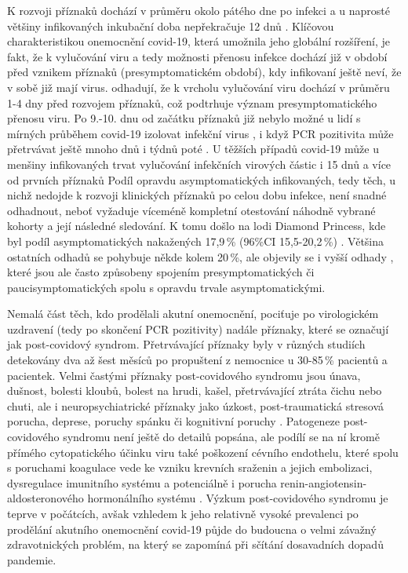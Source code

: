 K rozvoji příznaků dochází v průměru okolo pátého dne po infekci \cite{Zhang:2020,Xie:2020} a u naprosté většiny infikovaných inkubační doba nepřekračuje 12 dnů \cite{Wiersinga:2020}. Klíčovou charakteristikou onemocnění covid-19, která umožnila jeho globální rozšíření, je fakt, že k vylučování viru a tedy možnosti přenosu infekce dochází již v období před vznikem příznaků (presymptomatickém období), kdy infikovaní ještě neví, že v sobě již mají virus. \cite{Jones:2021} odhadují, že k vrcholu vylučování viru dochází v průměru 1-4 dny před rozvojem příznaků, což podtrhuje význam presymptomatického přenosu viru. Po 9.-10. dnu od začátku příznaků již nebylo možné u lidí s mírných průběhem covid-19 izolovat infekční virus \cite{Wolfel:2020,Jones:2021}, 
i když PCR pozitivita může přetrvávat ještě mnoho dnů i týdnů poté \cite{Byrne:2020}. U těžších případů covid-19 může u menšiny infikovaných trvat vylučování infekčních virových částic i 15 dnů a více od prvních příznaků \cite{Kampen:2021} Podíl opravdu asymptomatických infikovaných, tedy těch, u nichž nedojde k rozvoji klinických příznaků po celou dobu infekce, není snadné odhadnout, neboť vyžaduje víceméně kompletní otestování náhodně vybrané kohorty a její následné sledování. K tomu došlo na lodi Diamond Princess, kde byl podíl  asymptomatických nakažených 17,9\,\% (96\%CI 15,5-20,2\,\%) \cite{Mizumoto:2020}. Většina ostatních odhadů se pohybuje někde kolem 20\,\%, ale objevily se i vyšší odhady \cite{Yanes-Lane:2020}, které jsou ale často způsobeny spojením presymptomatických či paucisymptomatických spolu s opravdu trvale asymptomatickými.

Nemalá část těch, kdo prodělali akutní onemocnění, pociťuje po virologickém uzdravení (tedy po skončení PCR pozitivity)  nadále příznaky, které se označují jak post-covidový syndrom. Přetrvávající příznaky byly v různých studiích detekovány dva až šest měsíců po propuštení z nemocnice u 30-85\,\% pacientů a pacientek. Velmi častými příznaky post-covidového syndromu jsou únava, dušnost, bolesti kloubů, bolest na hrudi, kašel, přetrvávající ztráta čichu nebo chuti, ale i neuropsychiatrické příznaky jako úzkost, post-traumatická stresová porucha, deprese, poruchy spánku či kognitivní poruchy \cite{Nalbandian:2021}. Patogeneze post-covidového syndromu není ještě do detailů popsána, ale podílí se na ní kromě přímého cytopatického účinku viru také poškození cévního endothelu, které spolu s poruchami koagulace vede ke vzniku krevních sraženin a jejich embolizaci, dysregulace imunitního systému a potenciálně i porucha renin-angiotensin-aldosteronového hormonálního systému \cite{Gupta:2020}. Výzkum post-covidového syndromu je teprve v počátcích, avšak vzhledem k jeho relativně vysoké prevalenci po prodělání akutního onemocnění covid-19 půjde do budoucna o velmi závažný zdravotnických problém, na který se zapomíná při sčítání dosavadních dopadů pandemie.

